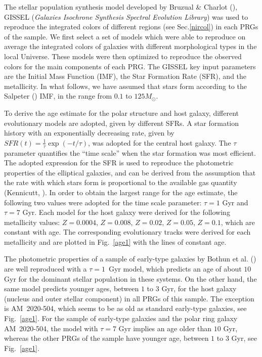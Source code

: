 \documentclass{aa}
\begin{document}
The stellar population synthesis model developed by Bruzual \& Charlot 
(\cite{BC93}), GISSEL ({\it Galaxies Isochrone Synthesis Spectral Evolution 
Library}) was used to reproduce the integrated colors of different regions
(see Sec.\ref{nircol}) in each PRGs of the sample. 
We first select a set of models which were able to reproduce
on average the integrated colors of galaxies with different morphological
types in the local Universe. These models were then optimized to reproduce the
observed colors for the main components of each PRG.
The GISSEL key input parameters are the Initial Mass Function (IMF),
the Star Formation Rate (SFR), and the metallicity. 
In what follows, we have assumed that stars form according to the
Salpeter (\cite{Salp55}) IMF, in the range from $0.1$ to $125 M_\odot$.

To derive the age estimate for the polar structure and host galaxy, 
different evolutionary models are adopted, given by different SFRs.
A star formation history with an exponentially decreasing rate,
given by $SFR(t)= \frac{1}{\tau} \exp{(- t/ \tau)}$,
was adopted for the central host galaxy. 
The $\tau$ parameter quantifies the ``time scale'' when the star formation
was most efficient. The adopted expression for the SFR is used
to reproduce the photometric properties of the elliptical galaxies,
and can be derived from the assumption that the rate with which stars form is
proportional to the available gas quantity (Kennicutt, \cite{Kenn83}).
In order to obtain the largest range for the age estimate, the following
two values were adopted for the time scale parameter: 
$\tau=1$ Gyr and $\tau =7$ Gyr. Each model for the host galaxy 
were derived for the following metallicity values: $Z=0.0004$, $Z=0.008$, 
$Z=0.02$, $Z=0.05$, $Z=0.1$, which are constant with age.
The corresponding evolutionary tracks were derived for each
metallicity and are plotted in Fig.~\ref{age1} with 
the lines of constant age.
 
The photometric properties of a sample of early-type galaxies by Bothun et al. 
(\cite{Bothun84}) are well reproduced with a $\tau =1$~Gyr model, which
predicts an age of about $10$ Gyr for the dominant stellar population in
these systems.
On the other hand, the same model predicts younger ages, between $1$ to
$3$ Gyr, for the host galaxy (nucleus and outer stellar component) in all
PRGs of this sample. The exception is AM~2020-504, which seems to be
as old as standard early-type galaxies, 
see Fig.~\ref{age1}.
For the sample of early-type galaxies and the polar ring galaxy AM~2020-504, 
the model with $\tau =7$ Gyr implies an age older than $10$ Gyr, 
whereas the other PRGs of the sample have younger age, between $1$ to
$3$ Gyr, see Fig.~\ref{age1}.
\end{document}
